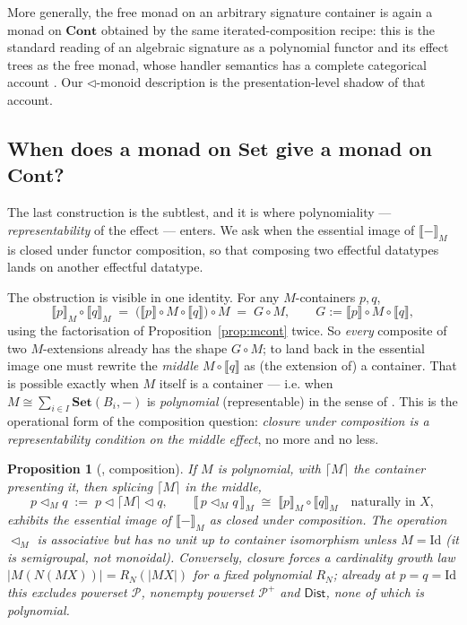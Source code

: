 \documentclass[11pt]{amsart}
\theoremstyle{plain}
\newtheorem{proposition}[theorem]{Proposition}
\theoremstyle{definition}
\theoremstyle{remark}
\newcommand{\Set}{\mathbf{Set}}
\newcommand{\Cont}{\mathbf{Cont}}
\newcommand{\ext}[1]{\llbracket #1 \rrbracket}
\newcommand{\extM}[1]{\llbracket #1 \rrbracket_{M}}
\newcommand{\Id}{\mathrm{Id}}
\newcommand{\tri}{\triangleleft}
\newcommand{\triM}{\triangleleft_{M}}
\newcommand{\ceil}[1]{\lceil #1 \rceil}
\newcommand{\Dist}{\mathsf{Dist}}
\newcommand{\PP}{\mathcal{P}}
\begin{document}
More generally, the free monad on an arbitrary signature container is again a monad on $\Cont$
obtained by the same iterated-composition recipe: this is the standard reading of an algebraic
signature as a polynomial functor and its effect trees as the free monad, whose handler semantics has
a complete categorical account \cite{EffectHandlers}. Our $\tri$-monoid description is the
presentation-level shadow of that account.

\subsection{When does a monad on $\Set$ give a monad on $\Cont$?}\label{ssec:compose}
The last construction is the subtlest, and it is where polynomiality --- \emph{representability} of
the effect --- enters. We ask when the essential image of $\extM{-}$ is closed under functor
composition, so that composing two effectful datatypes lands on another effectful datatype.

The obstruction is visible in one identity. For any $M$-containers $p,q$,
\[
  \extM{p}\circ\extM{q}
  \;=\;\big(\ext{p}\circ M\circ\ext{q}\big)\circ M
  \;=\; G\circ M,\qquad G:=\ext{p}\circ M\circ\ext{q},
\]
using the factorisation of Proposition~\ref{prop:mcont} twice. So \emph{every} composite of two
$M$-extensions already has the shape $G\circ M$; to land back in the essential image one must rewrite
the \emph{middle} $M\circ\ext{q}$ as (the extension of) a container. That is possible exactly when $M$
itself is a container --- i.e. when $M\cong\sum_{i\in I}\Set(B_i,-)$ is \emph{polynomial}
(representable) in the sense of \cite{GambinoKock}. This is the operational form of the composition question: \emph{closure under
composition is a representability condition on the middle effect}, no more and no less.

\begin{proposition}[\cite{MacBethCodensity}, composition]\label{prop:compose}
If $M$ is polynomial, with $\ceil{M}$ the container presenting it, then splicing $\ceil{M}$ in the
middle,
\[
  p\triM q \;:=\; p\tri\ceil{M}\tri q,\qquad
  \extM{\,p\triM q\,}\;\cong\;\extM{p}\circ\extM{q}\quad\text{naturally in }X,
\]
exhibits the essential image of $\extM{-}$ as closed under composition. The operation $\triM$ is
associative but has no unit up to container isomorphism unless $M=\Id$ (it is semigroupal, not
monoidal). Conversely, closure forces a cardinality growth law $|M(N(MX))|=R_N(|MX|)$ for a fixed
polynomial $R_N$; already at $p=q=\Id$ this excludes powerset $\PP$, nonempty powerset $\PP^{+}$ and
$\Dist$, none of which is polynomial.
\end{proposition}
\end{document}
